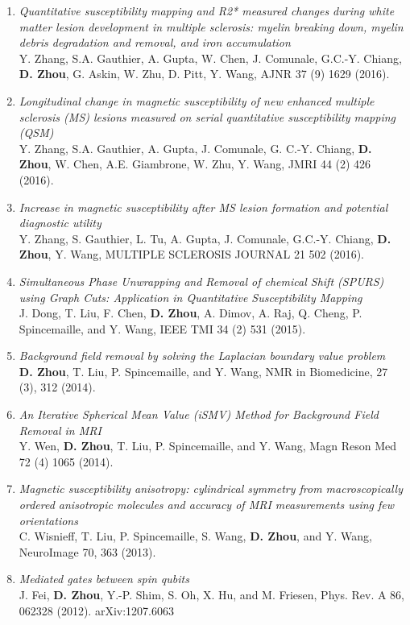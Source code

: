 \documentclass[centered,11pt,overlapped]{res}
\begin{document}
\begin{resume}
{\begin{enumerate}[leftmargin=-0.1in]
\item {\em Quantitative susceptibility mapping and R2* measured changes during white matter lesion development in multiple sclerosis: myelin breaking down, myelin debris degradation and removal, and iron accumulation }\\
Y. Zhang, S.A. Gauthier, A. Gupta, W. Chen, J. Comunale, G.C.-Y. Chiang, {\bf D. Zhou}, G. Askin, W. Zhu, D. Pitt, Y. Wang, AJNR 37 (9) 1629 (2016).
\item {\em Longitudinal change in magnetic susceptibility of new enhanced multiple sclerosis (MS) lesions measured on serial quantitative susceptibility mapping (QSM)}\\
Y. Zhang, S.A. Gauthier, A. Gupta, J. Comunale, G. C.-Y. Chiang, {\bf D. Zhou}, W. Chen, A.E. Giambrone, W. Zhu, Y. Wang, JMRI 44 (2) 426 (2016).
\item {\em Increase in magnetic susceptibility after MS lesion formation and potential diagnostic utility} \\
Y. Zhang, S. Gauthier, L. Tu, A. Gupta, J. Comunale, G.C.-Y. Chiang, {\bf D. Zhou}, Y. Wang, MULTIPLE SCLEROSIS JOURNAL 21 502 (2016).
\item {\em Simultaneous Phase Unwrapping and Removal of chemical Shift (SPURS) using Graph Cuts: Application in Quantitative Susceptibility Mapping}\\
J. Dong, T. Liu, F. Chen, {\bf D. Zhou}, A. Dimov, A. Raj, Q. Cheng, P. Spincemaille, and Y. Wang, IEEE TMI 34 (2) 531 (2015).
\item {\em Background field removal by solving the Laplacian boundary value problem}\\
{\bf D. Zhou}, T. Liu, P. Spincemaille, and Y. Wang, NMR in Biomedicine, 27 (3), 312 (2014).
\item {\em An Iterative Spherical Mean Value (iSMV) Method for Background Field Removal in MRI}\\
Y. Wen, {\bf D. Zhou}, T. Liu, P. Spincemaille, and Y. Wang, Magn Reson Med 72 (4) 1065 (2014). 
\item {\em Magnetic susceptibility anisotropy: cylindrical symmetry from macroscopically ordered anisotropic molecules and accuracy of MRI measurements using few orientations}\\
C. Wisnieff, T. Liu, P. Spincemaille, S. Wang, {\bf D. Zhou}, and Y. Wang,  NeuroImage 70, 363 (2013).
\item{\em Mediated gates between spin qubits} \\
J. Fei, {\bf D. Zhou}, Y.-P. Shim, S. Oh, X. Hu, and M. Friesen, Phys. Rev. A 86, 062328 (2012). arXiv:1207.6063 

\end{enumerate}}
\end{resume}
\end{document}
